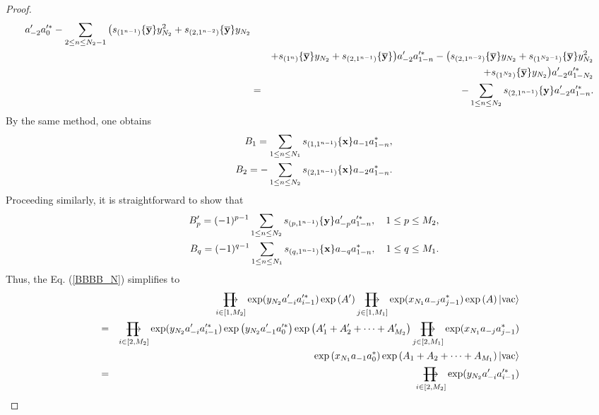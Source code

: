 \documentclass[10pt,a4paper]{amsart}
\numberwithin{equation}{section}
\def\rprod{\mathop{\prod{\mkern-28.0mu}{\mathbf\longrightarrow}}}
\begin{document}
\begin{proof}
\begin{eqnarray}
a^{\prime}_{-2}a^{\prime\ast}_{0}-\sum\limits_{2\leq n\leq N_{2}-1}\big(s_{(1^{n-1})}\{\mathbf{\overline{y}}\}y^{2}_{N_{2}}
+s_{(2,1^{n-2})}\{\mathbf{\overline{y}}\}
y_{N_{2}}\notag\\
&&+s_{(1^{n})}\{\mathbf{\overline{y}}\}y_{N_{2}}+s_{(2,1^{n-1})}
\{\mathbf{\overline{y}}\}\big)a^{\prime}_{-2}a^{\prime\ast}_{1-n}-
\big(s_{(2,1^{n-2})}\{\mathbf{\overline{y}}\}
y_{N_{2}}+s_{(1^{N_{2}-1})}\{\mathbf{\overline{y}}\}y^{2}_{N_{2}}\notag\\
&&+s_{(1^{N_{2}})}\{\mathbf{\overline{y}}\}y_{N_{2}}\big)
a^{\prime}_{-2}a^{\prime\ast}_{1-N_{2}}\notag\\
&=&-\sum\limits_{1\leq n\leq N_{2}}s_{(2,1^{n-1})}\{\mathbf{y}\}a^{\prime}_{-2}a^{\prime\ast}_{1-n}.
\end{eqnarray}
By the same method, one obtains
\begin{eqnarray}
&&B_{1}=\sum\limits_{1\leq n\leq N_{1}}s_{(1,1^{n-1})}\{\mathbf{x}\}a_{-1}a^{\ast}_{1-n},\notag\\
&&B_{2}=-\sum\limits_{1\leq n\leq N_{2}}s_{(2,1^{n-1})}\{\mathbf{x}\}a_{-2}a^{\ast}_{1-n}.
\end{eqnarray}
Proceeding similarly, it is straightforward to show that
\begin{eqnarray}
&&B^{\prime}_{p}=(-1)^{p-1}\sum\limits_{1\leq n\leq N_{2}}s_{(p,1^{n-1})}\{\mathbf{y}\}a^{\prime}_{-p}a^{\prime\ast}_{1-n},\quad 1\leq p\leq M_{2},\notag\\
&&B_{q}=(-1)^{q-1}\sum\limits_{1\leq n\leq N_{1}}s_{(q,1^{n-1})}\{\mathbf{x}\}a_{-q}a^{\ast}_{1-n},\quad 1\leq q\leq M_{1}.
\end{eqnarray}
Thus, the Eq. (\ref{BBBB_N}) simplifies to
\begin{eqnarray}
&&\rprod\limits_{i\in[1,M_{2}]}\exp(y_{N_{2}}a^{\prime}_{-i}a^{\prime\ast}_{i-1})
\exp\left(A^{\prime}\right)
\rprod\limits_{j\in[1,M_{1}]}\exp(x_{N_{1}}a_{-j}a^{\ast}_{j-1})\exp\left(A\right)
|\text{vac}\rangle\notag\\
&=&\rprod\limits_{i\in[2,M_{2}]}\exp(y_{N_{2}}a^{\prime}_{-i}a^{\prime\ast}_{i-1})
\exp\left(y_{N_{2}}a^{\prime}_{-1}a^{\prime\ast}_{0}\right)\exp\left(A^{\prime}_{1}
+A^{\prime}_{2}+\cdots+A^{\prime}_{M_{2}}\right)
\rprod\limits_{j\in[2,M_{1}]}\exp(x_{N_{1}}a_{-j}a^{\ast}_{j-1})\notag\\
&&\exp\left(x_{N_{1}}a_{-1}a^{\ast}_{0}\right)\exp\left(A_{1}
+A_{2}+\cdots+A_{M_{1}}\right)|\text{vac}\rangle\notag\\
&=&\rprod\limits_{i\in[2,M_{2}]}\exp(y_{N_{2}}a^{\prime}_{-i}a^{\prime\ast}_{i-1})

\end{eqnarray}
\end{proof}
\end{document}
